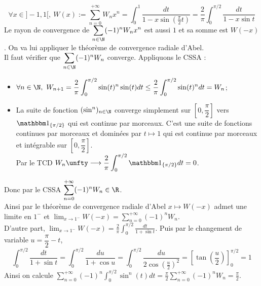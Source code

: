 \documentclass{book}
\begin{document}
\begin{enumerate}[leftmargin=*]
		$$\forall x\in ]-1,1[,\ W(x):=\sum_{n=0}^{+\infty}W_nx^n=\int_0^1\frac{dt}{1-x\sin\left(\frac{\pi}{2}t\right)}=\frac{2}{\pi}\int_0^{\pi/2}\frac{dt}{1-x\sin t}$$
		Le rayon de convergence de $\displaystyle\sum_{n\in \N}(-1)^nW_nx^n$ est aussi $1$ et sa somme est $W(-x)$. On va lui appliquer le théorème de convergence radiale d'Abel.\\
		Il faut vérifier que $\displaystyle\sum_{n\in \N}(-1)^nW_n$ converge. Appliquons le CSSA :
		\begin{itemize}
			\item $\forall n\in \N,\ W_{n+1}=\displaystyle\frac{2}{\pi}\int_0^{\pi/2}\sin(t)^n\sin(t)dt\leq \frac{2}{\pi}\int_0^{\pi/2}\sin(t)^ndt=W_n$;
			\item La suite de fonction $(\sin^n)_{n\in \N}$ converge simplement sur $\left[0,\dfrac{\pi}{2}\right]$ vers $\mathbbm 1_{\{\pi/2\}}$ qui est continue par morceaux. C'est une suite de fonctions continues par morceaux et dominées par $t\mapsto 1$ qui est continue par morceaux et intégrable sur $\left[0,\dfrac{\pi}{2}\right]$.\\
			Par le TCD $W_n\unfty\longrightarrow\displaystyle\frac{2}{\pi}\int_0^{\pi/2}\mathbbm 1_{\{\pi/2\}}dt=0$.
		\end{itemize}
		Donc par le CSSA $\displaystyle\sum_{n=0}^{+\infty}(-1)^nW_n\in \R$.\\
		Ainsi par le théorème de convergence radiale d'Abel $x\mapsto W(-x)$ admet une limite en $1^-$ et $\displaystyle\lim_{x\to 1^-}W(-x)=\sum_{n=0}^{+\infty}(-1)^nW_n$.\\
		D'autre part, $\displaystyle\lim_{x\to 1^-}W(-x)=\frac{2}{\pi}\int_0^{\pi/2}\frac{dt}{1+\sin t}$. Puis par le changement de variable $u=\dfrac{\pi}{2}-t$,
		$$\int_0^{\pi/2}\frac{dt}{1+\sin t}=\int_0^{\pi/2}\frac{du}{1+\cos u}=\int_0^{\pi/2}\frac{du}{2\cos\left(\frac{u}{2}\right)^2}=\left[\tan\left(\frac{u}{2}\right)\right]_0^{\pi/2}=1$$
		Ainsi on calcule $\displaystyle\sum_{n=0}^{+\infty}(-1)^n\int_0^{\pi/2}\sin^n(t)dt=\frac{\pi}{2}\sum_{n=0}^{+\infty}(-1)^nW_n=\frac{\pi}{2}$.
	\end{enumerate}
	
\end{document}
